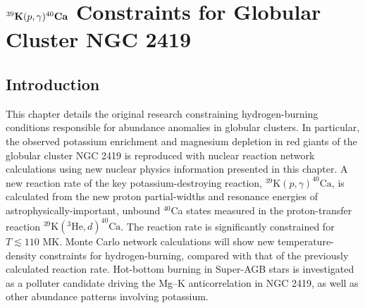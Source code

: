 \chapter{\texorpdfstring{$^{39}\mathrm{\textbf{K}}(\MakeLowercase{p},\gamma)^{40}\mathrm{\textbf{C\MakeLowercase{a}}}$}{39K(p,g)40Ca} Constraints for Globular Cluster NGC 2419}
\label{ch:GC}

\section{Introduction}


This chapter details the original research constraining hydrogen-burning conditions responsible for abundance anomalies in globular clusters. In particular, the observed potassium enrichment and magnesium depletion in red giants of the globular cluster NGC 2419 is reproduced with nuclear reaction network calculations using new nuclear physics information presented in this chapter. A new reaction rate of the key potassium-destroying reaction, $^{39}\mathrm{K}(p,\gamma)^{40}\mathrm{Ca}$, is calculated from the new proton partial-widths and resonance energies of astrophysically-important, unbound $^{40}$Ca states measured in the proton-transfer reaction $^{39}\mathrm{K}(^{3}\mathrm{He},d)^{40}\mathrm{Ca}$. The reaction rate is significantly constrained for $T \lesssim 110$ MK. Monte Carlo network calculations will show new temperature-density constraints for hydrogen-burning, compared with that of the previously calculated reaction rate. Hot-bottom burning in Super-AGB stars is investigated as a polluter candidate driving the Mg--K anticorrelation in NGC 2419, as well as other abundance patterns involving potassium.

